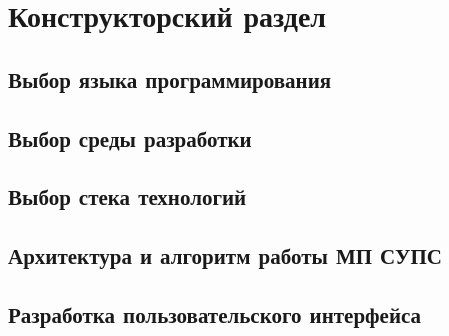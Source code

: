 \chapter{Конструкторский раздел}
\label{ch:design}

\section{Выбор языка программирования}
\label{sec:language}

\section{Выбор среды разработки}
\label{sec:ide}

\section{Выбор стека технологий}
\label{sec:stack}

\section{Архитектура и алгоритм работы МП СУПС}
\label{sec:architecture}

\section{Разработка пользовательского интерфейса}
\label{sec:gui}
